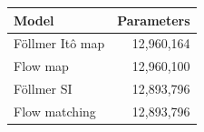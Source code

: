 \begin{tabular}{lr}
\toprule
Model & Parameters \\
\midrule
Föllmer Itô map & 12,960,164 \\
Flow map & 12,960,100 \\
Föllmer SI & 12,893,796 \\
Flow matching & 12,893,796 \\
\bottomrule
\end{tabular}
